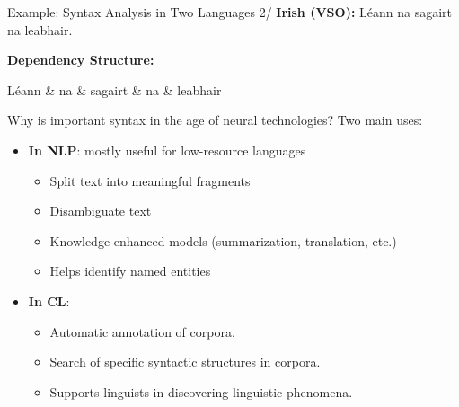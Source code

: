 \documentclass{beamer}
\begin{document}
\begin{frame}{Example: Syntax Analysis in Two Languages 2/}
    \textbf{Irish (VSO):} Léann na sagairt na leabhair.\\

    \vspace{0.5cm}
\fboxsep=0pt
%
\hfill{%
\begin{minipage}[t]{0.42\linewidth}
\textbf{Dependency Structure:}

    \begin{dependency}[theme=night]
        \begin{deptext}
            Léann \& na \& sagairt \& na \& leabhair \\
        \end{deptext}
    \end{dependency}
\end{minipage}
}
\end{frame}

\begin{frame}{Why is important syntax in the age of neural technologies?}
    Two main uses:
    \begin{itemize}
        \item \textbf{In NLP}: mostly useful for low-resource languages
        \begin{itemize}
            \item Split text into meaningful fragments
            \item Disambiguate text
            \item Knowledge-enhanced models (summarization, translation, etc.)
            \item Helps identify named entities
        \end{itemize}
        \item \textbf{In CL}:
        \begin{itemize}
            \item Automatic annotation of corpora.
            \item Search of specific syntactic structures in corpora.
            \item Supports linguists in discovering linguistic phenomena.
        \end{itemize}
    \end{itemize}
\end{frame}
\end{document}
